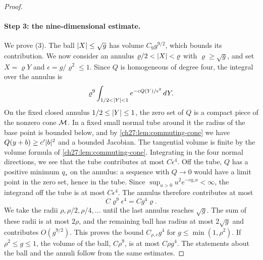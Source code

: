 \begin{proof}
\paragraph{Step 3: the nine-dimensional estimate.}
We prove (3). The ball $\lvert X\rvert\le\sqrt g$ has volume $C_9g^{9/2}$, which bounds its contribution. We now consider an annulus $\varrho/2<\lvert X\rvert<\varrho$ with $\varrho\ge\sqrt g$, and set $X=\varrho Y$ and $\epsilon=g/\varrho^2\le1$. Since $Q$ is homogeneous of degree four, the integral over the annulus is
\[
 \varrho^9\int_{1/2<\lvert Y\rvert<1}e^{-cQ(Y)/\epsilon^2}\,dY.
\]
On the fixed closed annulus $1/2\le\lvert Y\rvert\le1$, the zero set of $Q$ is a compact piece of the nonzero cone $\mathcal M$. In a fixed small normal tube around it the radius of the base point is bounded below, and by \cref{ch27:lem:commuting-cone} we have $Q(y+b)\ge c'\lvert b\rvert^2$ and a bounded Jacobian. The tangential volume is finite by the volume formula of \cref{ch27:lem:commuting-cone}. Integrating in the four normal directions, we see that the tube contributes at most $C\epsilon^4$. Off the tube, $Q$ has a positive minimum $q_*$ on the annulus: a sequence with $Q\to0$ would have a limit point in the zero set, hence in the tube. Since $\sup_{u>0}u^2e^{-cq_*u}<\infty$, the integrand off the tube is at most $C\epsilon^4$. The annulus therefore contributes at most
\begin{equation}\label{ch27:eq:dyadic-cone}
 C\varrho^9\epsilon^4=Cg^4\varrho.
\end{equation}
We take the radii $\rho,\rho/2,\rho/4,\dots$ until the last annulus reaches $\sqrt g$. The sum of these radii is at most $2\rho$, and the remaining ball has radius at most $2\sqrt g$ and contributes $O(g^{9/2})$. This proves the bound $C_{\rho,c}g^4$ for $g\le\min(1,\rho^2)$. If $\rho^2\le g\le1$, the volume of the ball, $C\rho^9$, is at most $C\rho g^4$. The statements about the ball and the annuli follow from the same estimates.


\end{proof}
